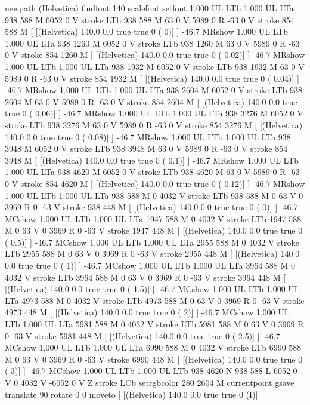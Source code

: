 newpath
(Helvetica) findfont 140 scalefont setfont
1.000 UL
LTb
1.000 UL
LTa
938 588 M
6052 0 V
stroke
LTb
938 588 M
63 0 V
5989 0 R
-63 0 V
stroke
854 588 M
[ [(Helvetica) 140.0 0.0 true true 0 ( 0)]
] -46.7 MRshow
1.000 UL
LTb
1.000 UL
LTa
938 1260 M
6052 0 V
stroke
LTb
938 1260 M
63 0 V
5989 0 R
-63 0 V
stroke
854 1260 M
[ [(Helvetica) 140.0 0.0 true true 0 ( 0.02)]
] -46.7 MRshow
1.000 UL
LTb
1.000 UL
LTa
938 1932 M
6052 0 V
stroke
LTb
938 1932 M
63 0 V
5989 0 R
-63 0 V
stroke
854 1932 M
[ [(Helvetica) 140.0 0.0 true true 0 ( 0.04)]
] -46.7 MRshow
1.000 UL
LTb
1.000 UL
LTa
938 2604 M
6052 0 V
stroke
LTb
938 2604 M
63 0 V
5989 0 R
-63 0 V
stroke
854 2604 M
[ [(Helvetica) 140.0 0.0 true true 0 ( 0.06)]
] -46.7 MRshow
1.000 UL
LTb
1.000 UL
LTa
938 3276 M
6052 0 V
stroke
LTb
938 3276 M
63 0 V
5989 0 R
-63 0 V
stroke
854 3276 M
[ [(Helvetica) 140.0 0.0 true true 0 ( 0.08)]
] -46.7 MRshow
1.000 UL
LTb
1.000 UL
LTa
938 3948 M
6052 0 V
stroke
LTb
938 3948 M
63 0 V
5989 0 R
-63 0 V
stroke
854 3948 M
[ [(Helvetica) 140.0 0.0 true true 0 ( 0.1)]
] -46.7 MRshow
1.000 UL
LTb
1.000 UL
LTa
938 4620 M
6052 0 V
stroke
LTb
938 4620 M
63 0 V
5989 0 R
-63 0 V
stroke
854 4620 M
[ [(Helvetica) 140.0 0.0 true true 0 ( 0.12)]
] -46.7 MRshow
1.000 UL
LTb
1.000 UL
LTa
938 588 M
0 4032 V
stroke
LTb
938 588 M
0 63 V
0 3969 R
0 -63 V
stroke
938 448 M
[ [(Helvetica) 140.0 0.0 true true 0 ( 0)]
] -46.7 MCshow
1.000 UL
LTb
1.000 UL
LTa
1947 588 M
0 4032 V
stroke
LTb
1947 588 M
0 63 V
0 3969 R
0 -63 V
stroke
1947 448 M
[ [(Helvetica) 140.0 0.0 true true 0 ( 0.5)]
] -46.7 MCshow
1.000 UL
LTb
1.000 UL
LTa
2955 588 M
0 4032 V
stroke
LTb
2955 588 M
0 63 V
0 3969 R
0 -63 V
stroke
2955 448 M
[ [(Helvetica) 140.0 0.0 true true 0 ( 1)]
] -46.7 MCshow
1.000 UL
LTb
1.000 UL
LTa
3964 588 M
0 4032 V
stroke
LTb
3964 588 M
0 63 V
0 3969 R
0 -63 V
stroke
3964 448 M
[ [(Helvetica) 140.0 0.0 true true 0 ( 1.5)]
] -46.7 MCshow
1.000 UL
LTb
1.000 UL
LTa
4973 588 M
0 4032 V
stroke
LTb
4973 588 M
0 63 V
0 3969 R
0 -63 V
stroke
4973 448 M
[ [(Helvetica) 140.0 0.0 true true 0 ( 2)]
] -46.7 MCshow
1.000 UL
LTb
1.000 UL
LTa
5981 588 M
0 4032 V
stroke
LTb
5981 588 M
0 63 V
0 3969 R
0 -63 V
stroke
5981 448 M
[ [(Helvetica) 140.0 0.0 true true 0 ( 2.5)]
] -46.7 MCshow
1.000 UL
LTb
1.000 UL
LTa
6990 588 M
0 4032 V
stroke
LTb
6990 588 M
0 63 V
0 3969 R
0 -63 V
stroke
6990 448 M
[ [(Helvetica) 140.0 0.0 true true 0 ( 3)]
] -46.7 MCshow
1.000 UL
LTb
1.000 UL
LTb
938 4620 N
938 588 L
6052 0 V
0 4032 V
-6052 0 V
Z stroke
LCb setrgbcolor
280 2604 M
currentpoint gsave translate 90 rotate 0 0 moveto
[ [(Helvetica) 140.0 0.0 true true 0 (I)]
